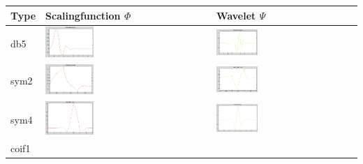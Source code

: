 \begin{center}
	\begin{tabular}{l||m{}|m{}}
		Type & Scalingfunction $\Phi$ & Wavelet $\Psi$ \\
		\hline
		db5 &
		\includegraphics[width=0.3\textwidth]{content/Db5Phi.png} &
		\includegraphics[width=0.3\textwidth]{content/Db5Psi.png} \\
		sym2 & 
		\includegraphics[width=0.3\textwidth]{content/Sym2Phi.png} &
		\includegraphics[width=0.3\textwidth]{content/Sym2Psi.png} \\
		sym4 & 
		\includegraphics[width=0.3\textwidth]{content/Sym4Phi.png} &
		\includegraphics[width=0.3\textwidth]{content/Sym4Psi.png} \\
		coif1 &

\end{tabular}
\end{center}
